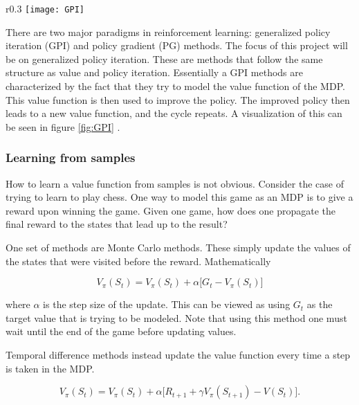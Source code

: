 \begin{wrapfigure}[8]{r}{0.3\textwidth} %
    \vspace*{-0.5cm}
    \centering
    \texttt{[image: GPI]}
    \caption{\textbf{Visualization of GPI.} Taken from p. 86 \cite{sutton_barto_2018}}
    \label{fig:GPI}
\end{wrapfigure}

There are two major paradigms in reinforcement learning: generalized policy iteration (GPI) and policy gradient (PG) methods. The focus of this project will be on generalized policy iteration. These are methods that follow the same structure as value and policy iteration. Essentially a GPI methods are characterized by the fact that they try to model the value function of the MDP. This value function is then used to improve the policy. The improved policy then leads to a new value function, and the cycle repeats. A visualization of this can be seen in figure \ref{fig:GPI} \citep[p.~86]{sutton_barto_2018}.

\subsubsection{Learning from samples}

How to learn a value function from samples is not obvious. Consider the case of trying to learn to play chess. One way to model this game as an MDP is to give a reward upon winning the game. Given one game, how does one propagate the final reward to the states that lead up to the result?

One set of methods are Monte Carlo methods. These simply update the values of the states that were visited before the reward. Mathematically 

\begin{equation}
    V_\pi(S_t) = V_\pi(S_t) + \alpha \big[G_t - V_\pi(S_t)]
\end{equation}

where $\alpha$ is the step size of the update. This can be viewed as using $G_t$ as the target value that is trying to be modeled. Note that using this method one must wait until the end of the game before updating values.

Temporal difference methods instead update the value function every time a step is taken in the MDP.

\begin{equation}
    V_\pi(S_t) = V_\pi(S_t) + \alpha \big[R_{t+1} + \gamma V_\pi(S_{t+1}) - V(S_t)].
\end{equation}

